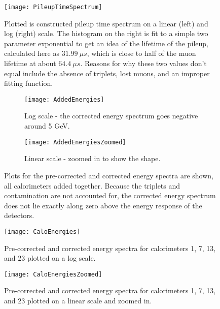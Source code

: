     \begin{figure}[]
        \centering
        \texttt{[image: PileupTimeSpectrum]}
        \caption[PileupTimeSpectrum]{Plotted is constructed pileup time spectrum on a linear (left) and log (right) scale. The histogram on the right is fit to a simple two parameter exponential to get an idea of the lifetime of the pileup, calculated here as $\SI{31.99}{\mu s}$, which is close to half of the muon lifetime at about $\SI{64.4}{\mu s}$. Reasons for why these two values don't equal include the absence of triplets, lost muons, and an improper fitting function.}
        \label{fig:PileupTimeSpectrum}
    \end{figure}



    \begin{figure}[]
    \centering
        \begin{subfigure}[]{0.8\textwidth}
            \centering
            \texttt{[image: AddedEnergies]}
            \caption{Log scale - the corrected energy spectrum goes negative around 5 GeV.}
        \end{subfigure}%
        \vspace{1cm}
        \begin{subfigure}[]{0.8\textwidth}
            \centering
            \texttt{[image: AddedEnergiesZoomed]}
            \caption{Linear scale - zoomed in to show the shape.}
        \end{subfigure}
    \caption[AddedEnergies]{Plots for the pre-corrected and corrected energy spectra are shown, all calorimeters added together. Because the triplets and contamination are not accounted for, the corrected energy spectrum does not lie exactly along zero above the energy response of the detectors.}
    \label{fig:AddedEnergies}
    \end{figure}

    \begin{figure}[]
        \centering
        \texttt{[image: CaloEnergies]}
        \caption[CaloEnergies]{Pre-corrected and corrected energy spectra for calorimeters 1, 7, 13, and 23 plotted on a log scale.}    
        \label{fig:CaloEnergies}
    \end{figure}

    \begin{figure}[]
        \centering
        \texttt{[image: CaloEnergiesZoomed]}
        \caption[CaloEnergiesZoomed]{Pre-corrected and corrected energy spectra for calorimeters 1, 7, 13, and 23 plotted on a linear scale and zoomed in.}    
        \label{fig:CaloEnergiesZoomed}
    \end{figure}










